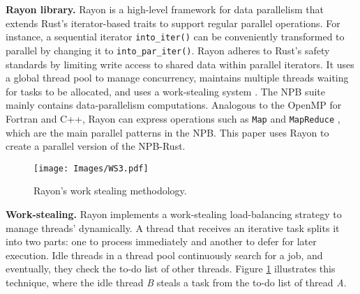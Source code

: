     \textbf{Rayon library.} Rayon is a high-level framework for data parallelism that extends Rust's iterator-based traits to support regular parallel operations. For instance, a sequential iterator \texttt{into\_iter()} can be conveniently transformed to parallel by changing it to \texttt{into\_par\_iter()}. Rayon adheres to Rust's safety standards by limiting write access to shared data within parallel iterators. It uses a global thread pool to manage concurrency, maintains multiple threads waiting for tasks to be allocated, and uses a work-stealing system \cite{rayon}. The NPB suite mainly contains data-parallelism computations. Analogous to the OpenMP for Fortran and C++, Rayon can express operations such as \texttt{Map} and \texttt{MapReduce} \cite{map}, which are the main parallel patterns in the NPB. This paper uses Rayon to create a parallel version of the NPB-Rust.

        \begin{figure}[t]
        \centering
        \texttt{[image: Images/WS3.pdf]}
        \vspace{-0.4cm}
        \caption{Rayon's work stealing methodology.}
        \vspace{-0.4cm}
        \label{fig:ws}
        \end{figure}

         \textbf{Work-stealing.} Rayon implements a work-stealing load-balancing strategy to manage threads' dynamically. A thread that receives an iterative task splits it into two parts: one to process immediately and another to defer for later execution. Idle threads in a thread pool continuously search for a job, and eventually, they check the to-do list of other threads. Figure \ref{fig:ws} illustrates this technique, where the idle thread \textit{B} steals a task from the to-do list of thread \textit{A}.


